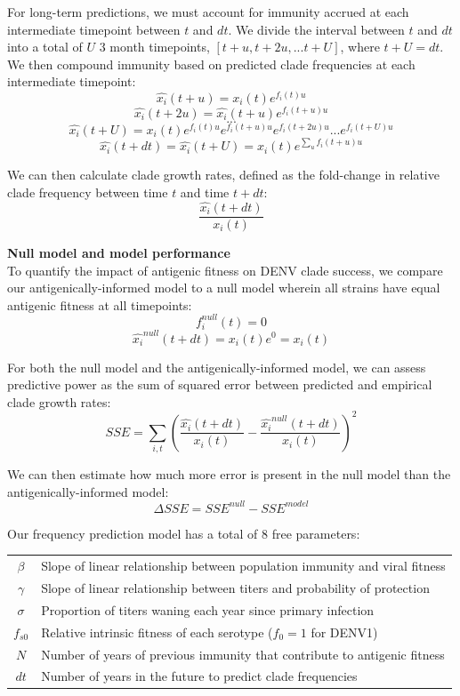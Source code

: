 \documentclass[11pt,oneside,letterpaper]{article}
\begin{document}
For long-term predictions, we must account for immunity accrued at each intermediate timepoint between $t$ and $dt$.
We divide the interval between $t$ and $dt$ into a total of $U$ 3 month timepoints, $[t+u, t+2u, ... t+U]$, where $t+U=dt$.
We then compound immunity based on predicted clade frequencies at each intermediate timepoint:
$$\hat{x_i}(t+u) = x_i(t)e^{f_i(t) u}$$
$$\hat{x_i}(t+2u) = \hat{x_i}(t+u) e^{f_i(t+u)u}$$
$$...$$
$$\hat{x_i}(t+U) = x_i(t) e^{f_i(t)u} e^{f_i(t+u)u} e^{f_i(t+2u)u} ... e^{f_i(t+U)u}$$
$$\hat{x_i}(t+dt) = \hat{x_i}(t+U) = x_i(t) e^{\sum_{u}f_i(t+u)u}$$

We can then calculate clade growth rates, defined as the fold-change in relative clade frequency between time $t$ and time $t+dt$:
$$\frac{\hat{x_i}(t+dt)}{x_i(t)}$$

\textbf{Null model and model performance}\\
To quantify the impact of antigenic fitness on DENV clade success, we compare our antigenically-informed model to a null model wherein all strains have equal antigenic fitness at all timepoints:
$$f_i^{null}(t) = 0$$
$$\hat{x_i}^{null}(t+dt) = x_i(t) e^0 = x_i(t)$$

For both the null model and the antigenically-informed model, we can assess predictive power as the sum of squared error between predicted and empirical clade growth rates:
$$SSE = \sum_{i,t} (\frac{\hat{x_i}(t+dt)}{x_i(t)} - \frac{\hat{x_i}^{null}(t+dt)}{x_i(t)})^2$$

We can then estimate how much more error is present in the null model than the antigenically-informed model:
$$\Delta SSE = SSE^{null} - SSE^{model}$$

Our frequency prediction model has a total of 8 free parameters:
\begin{table}[h!]
  \begin{center}
    \label{parameter_definition}
    \begin{tabular}{c|l}
      $\beta$ & Slope of linear relationship between population immunity and viral fitness\\
      $\gamma$ & Slope of linear relationship between titers and probability of protection\\
      $\sigma$ & Proportion of titers waning each year since primary infection\\
      $f_{s0}$ & Relative intrinsic fitness of each serotype ($f_0 = 1$ for DENV1)\\
      $N$ & Number of years of previous immunity that contribute to antigenic fitness\\
      $dt$ & Number of years in the future to predict clade frequencies\\
    \end{tabular}
  \end{center}
\end{table}
\end{document}
